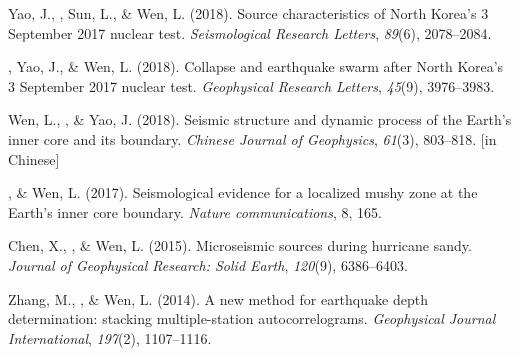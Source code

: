\begin{etaremune}
\item
    Yao, J., \Tian\CF, Sun, L., \& Wen, L. (2018).
	Source characteristics of North Korea's 3 September 2017 nuclear test.
    \emph{Seismological Research Letters}, \emph{89}(6), 2078--2084.
\item
    \Tian\CS, Yao, J., \& Wen, L. (2018).
    Collapse and earthquake swarm after North Korea's 3 September 2017 nuclear test.
    \emph{Geophysical Research Letters}, \emph{45}(9), 3976--3983.
\item
    Wen, L., \Tian, \& Yao, J. (2018).
    Seismic structure and dynamic process of the Earth's inner core and its boundary.
    \emph{Chinese Journal of Geophysics}, \emph{61}(3), 803--818.
     [in Chinese]
\item
    \Tian, \& Wen, L. (2017).
    Seismological evidence for a localized mushy zone at the Earth's inner core boundary.
    \emph{Nature communications}, 8, 165.
\item
    Chen, X., \Tian, \& Wen, L. (2015).
    Microseismic sources during hurricane sandy.
    \emph{Journal of Geophysical Research: Solid Earth}, \emph{120}(9), 6386--6403.
\item Zhang, M., \Tian, \& Wen, L. (2014).
    A new method for earthquake depth determination: stacking multiple-station autocorrelograms.
    \emph{Geophysical Journal International}, \emph{197}(2), 1107--1116.
\end{etaremune}



